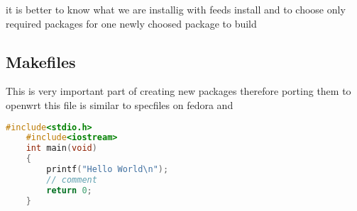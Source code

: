 it is better to know what we are installig with feeds install and to choose only required packages for one newly choosed package to build

\subsection{Makefiles}

This is very important part of creating new packages therefore porting them to openwrt this file is similar to specfiles on fedora and

\begin{lstlisting}[language=c,basicstyle=\ttfamily\footnotesize,label=c,caption=Basic C code.]
    #include<stdio.h>
    #include<iostream>
    int main(void)
    {
        printf("Hello World\n");
        // comment
        return 0;
    }
\end{lstlisting}
